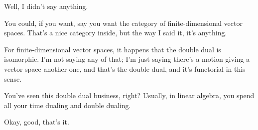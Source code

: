 \begin{speech}[01:30:08 - 01:30:50]
Well, I didn't say anything.

You could, if you want, say you want the category of finite-dimensional vector spaces. That's a nice category inside, but the way I said it, it's anything.

For finite-dimensional vector spaces, it happens that the double dual is isomorphic. I'm not saying any of that; I'm just saying there's a motion giving a vector space another one, and that's the double dual, and it's functorial in this sense.

You've seen this double dual business, right? Usually, in linear algebra, you spend all your time dualing and double dualing.

Okay, good, that's it. 
\end{speech}

